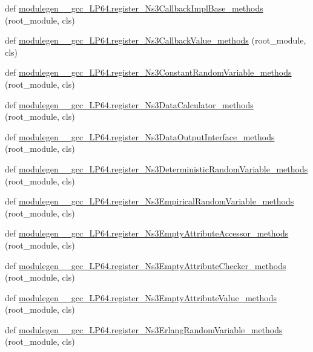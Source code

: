 \begin{DoxyCompactItemize}
\item 
def \hyperlink{namespacemodulegen____gcc__LP64_a27471f48136ec47282f70d414c0f7b6a}{modulegen\+\_\+\+\_\+gcc\+\_\+\+L\+P64.\+register\+\_\+\+Ns3\+Callback\+Impl\+Base\+\_\+methods} (root\+\_\+module, cls)
\item 
def \hyperlink{namespacemodulegen____gcc__LP64_a08b703ec5906729a642f77b58b43c8d8}{modulegen\+\_\+\+\_\+gcc\+\_\+\+L\+P64.\+register\+\_\+\+Ns3\+Callback\+Value\+\_\+methods} (root\+\_\+module, cls)
\item 
def \hyperlink{namespacemodulegen____gcc__LP64_a8d165075e9af75216b2620cd187d2f4e}{modulegen\+\_\+\+\_\+gcc\+\_\+\+L\+P64.\+register\+\_\+\+Ns3\+Constant\+Random\+Variable\+\_\+methods} (root\+\_\+module, cls)
\item 
def \hyperlink{namespacemodulegen____gcc__LP64_aaeec57b7af760ecc9a69a1f05428c58d}{modulegen\+\_\+\+\_\+gcc\+\_\+\+L\+P64.\+register\+\_\+\+Ns3\+Data\+Calculator\+\_\+methods} (root\+\_\+module, cls)
\item 
def \hyperlink{namespacemodulegen____gcc__LP64_a2c41a898ddf1146e0cdffc3660d57323}{modulegen\+\_\+\+\_\+gcc\+\_\+\+L\+P64.\+register\+\_\+\+Ns3\+Data\+Output\+Interface\+\_\+methods} (root\+\_\+module, cls)
\item 
def \hyperlink{namespacemodulegen____gcc__LP64_a627e4424c53832709ec25ad4e541cec5}{modulegen\+\_\+\+\_\+gcc\+\_\+\+L\+P64.\+register\+\_\+\+Ns3\+Deterministic\+Random\+Variable\+\_\+methods} (root\+\_\+module, cls)
\item 
def \hyperlink{namespacemodulegen____gcc__LP64_a62433119796a27d3b8c284710fe975f9}{modulegen\+\_\+\+\_\+gcc\+\_\+\+L\+P64.\+register\+\_\+\+Ns3\+Empirical\+Random\+Variable\+\_\+methods} (root\+\_\+module, cls)
\item 
def \hyperlink{namespacemodulegen____gcc__LP64_a5885028edb9b0cbbdf4f75d1388d6b19}{modulegen\+\_\+\+\_\+gcc\+\_\+\+L\+P64.\+register\+\_\+\+Ns3\+Empty\+Attribute\+Accessor\+\_\+methods} (root\+\_\+module, cls)
\item 
def \hyperlink{namespacemodulegen____gcc__LP64_aa52eca018e0116d17b4c6c2798dcee71}{modulegen\+\_\+\+\_\+gcc\+\_\+\+L\+P64.\+register\+\_\+\+Ns3\+Empty\+Attribute\+Checker\+\_\+methods} (root\+\_\+module, cls)
\item 
def \hyperlink{namespacemodulegen____gcc__LP64_a86864e6a4eb56d909f7b4550592ead3b}{modulegen\+\_\+\+\_\+gcc\+\_\+\+L\+P64.\+register\+\_\+\+Ns3\+Empty\+Attribute\+Value\+\_\+methods} (root\+\_\+module, cls)
\item 
def \hyperlink{namespacemodulegen____gcc__LP64_a7b3e5038bffbb5bc57da9d63ad434648}{modulegen\+\_\+\+\_\+gcc\+\_\+\+L\+P64.\+register\+\_\+\+Ns3\+Erlang\+Random\+Variable\+\_\+methods} (root\+\_\+module, cls)

\end{DoxyCompactItemize}
